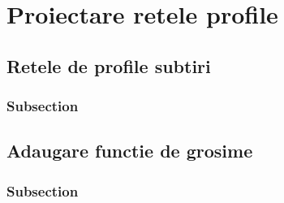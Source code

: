 \chapter{Proiectare retele profile}\label{chapter:proiectare}

\section{Retele de profile subtiri}

\subsection{Subsection}

\section{Adaugare functie de grosime}

\subsection{Subsection}